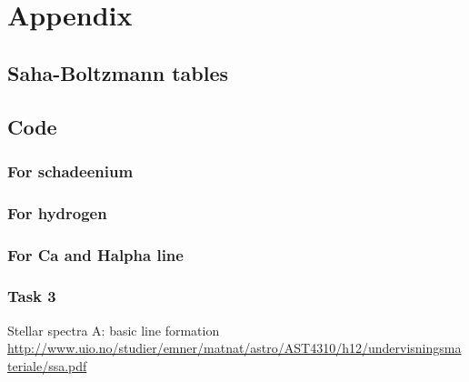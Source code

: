 \documentclass{article}
\begin{document}
\section{Appendix}
\subsection{Saha-Boltzmann tables}

\subsection{Code}
\subsubsection{For schadeenium}

\subsubsection{For hydrogen}

\subsubsection{For Ca and Halpha line}


\subsubsection{Task 3}







\begin{thebibliography}{40}
  Stellar spectra A: basic line formation\\\href{http://www.uio.no/studier/emner/matnat/astro/AST4310/h12/undervisningsmateriale/ssa.pdf}{http://www.uio.no/studier/emner/matnat/astro/AST4310/h12/undervisningsmateriale/ssa.pdf}
\end{thebibliography}
\end{document}
